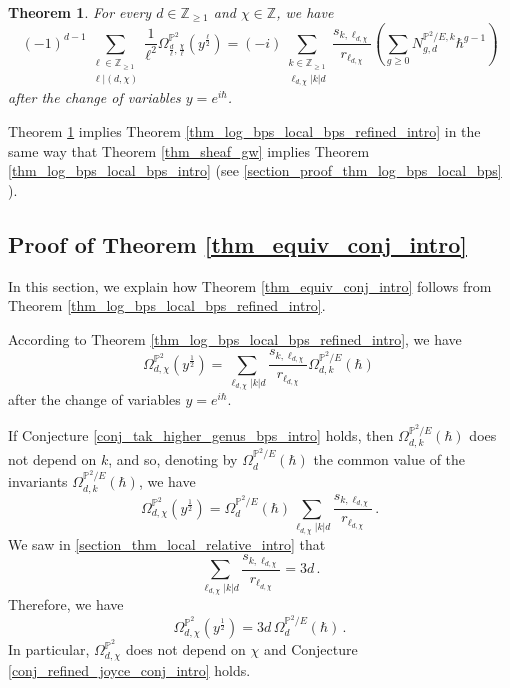 \documentclass[11pt,letterpaper]{amsart}
\newtheorem{thm}[defn]{Theorem}
\newcommand\PP{\mathbb P}
\newcommand\Z{\mathbb Z}
\begin{document}
\begin{thm} \label{thm_sheaf_gw_refined}
For every $d \in \Z_{\geqslant 1}$ and $\chi \in \Z$, we have 
\[ (-1)^{d-1}
\sum_{\substack{\ell \in \Z_{\geqslant 1} \\\ell|(d,\chi)}}
\frac{1}{\ell^2} \Omega_{\frac{d}{\ell},\frac{\chi}{\ell}}^{\PP^2}(y^{\frac{\ell}{2}})
=
(-i)
\sum_{\substack{k\in \Z_{\geqslant 1}\\
\ell_{d,\chi}|k|d}}
\frac{s_{k,\ell_{d,\chi}}}{r_{\ell_{d,\chi}}}
\left(
\sum_{g \geqslant 0} N_{g,d}^{\PP^2/E,k}
\hbar^{g-1}
\right)\]
after the change of variables $y=e^{i\hbar}$.
\end{thm}

Theorem \ref{thm_sheaf_gw_refined} implies Theorem \ref{thm_log_bps_local_bps_refined_intro}
in the same way that Theorem \ref{thm_sheaf_gw} implies Theorem \ref{thm_log_bps_local_bps_intro}
(see \cref{section_proof_thm_log_bps_local_bps}
).

\subsection{Proof of Theorem \ref{thm_equiv_conj_intro}}
\label{section_proof_section_proof_thm_log_bps_local_bps_refined_intro}
In this section, we explain how Theorem \ref{thm_equiv_conj_intro}
follows from Theorem \ref{thm_log_bps_local_bps_refined_intro}.

According to Theorem \ref{thm_log_bps_local_bps_refined_intro}, we have 
\[ 
\Omega_{d,\chi}^{\PP^2}(y^{\frac{1}{2}})=\sum_{\ell_{d,\chi}|k|d}
\frac{s_{k,\ell_{d,\chi}}}{r_{\ell_{d,\chi}}} \Omega_{d,k}^{\PP^2/E}(\hbar)\,\]
after the change of variables 
$y=e^{i\hbar}$.

If Conjecture \ref{conj_tak_higher_genus_bps_intro} holds, then $\Omega_{d,k}^{\PP^2/E}(\hbar)$ does not depend on $k$, and so, denoting by 
$\Omega_d^{\PP^2/E}(\hbar)$ the common value of the invariants $\Omega_{d,k}^{\PP^2/E}(\hbar)$, we have 
\[ \Omega_{d,\chi}^{\PP^2}(y^{\frac{1}{2}})=
\Omega_d^{\PP^2/E}(\hbar)
\sum_{\ell_{d,\chi}|k|d}
\frac{s_{k,\ell_{d,\chi}}}{r_{\ell_{d,\chi}}}\,.\]
We saw in \cref{section_thm_local_relative_intro} that 
\[ \sum_{\ell_{d,\chi}|k|d}
\frac{s_{k,\ell_{d,\chi}}}{r_{\ell_{d,\chi}}}=3d\,.\]
Therefore, we have 
\[ 
\Omega_{d,\chi}^{\PP^2}(y^{\frac{1}{2}})=3d\,
\Omega_d^{\PP^2/E}(\hbar)\,.\]
In particular, $\Omega_{d,\chi}^{\PP^2}$ does not depend on $\chi$ and Conjecture 
\ref{conj_refined_joyce_conj_intro} holds.
\end{document}
